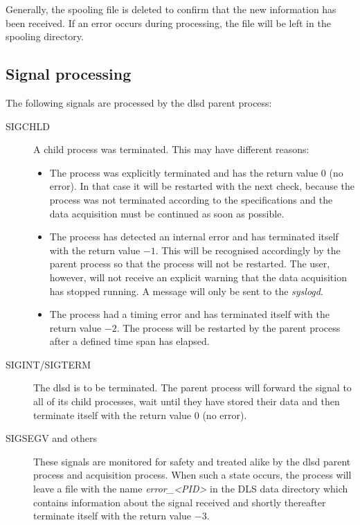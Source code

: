 \documentclass[a4paper,12pt,BCOR6mm,bibtotoc,idxtotoc]{scrbook}
\begin{document}
Generally, the spooling file is deleted to confirm that the new information has been received. If an error occurs during processing, the file will be left in the spooling directory.


\subsection{Signal processing} \label{sec:dlsd_mother_signals} 

The following signals are processed by the dlsd parent process:

\begin{description} 
\item[SIGCHLD] A child process was terminated. This may have different reasons: \begin{itemize} 
\item The process was explicitly terminated and has the return value 0 (no error). In that case it will be restarted with the next check, because the process was not terminated according to the specifications and the data acquisition must be continued as soon as possible. 
\item The process has detected an internal error and has terminated itself with the return value $-1$. This will be recognised accordingly by the parent process so that the process will not be restarted. The user, however, will not receive an explicit warning that the data acquisition has stopped running. A message will only be sent to the \textit{syslogd}. 
\item The process had a timing error and has terminated itself with the return  value $-2$. The process will be restarted by the parent process after a defined time span has elapsed. \end{itemize} 
\item[SIGINT/SIGTERM] The dlsd is to be terminated. The parent process will forward the signal to all of its child processes, wait until they have stored their data and then terminate itself with the return value 0 (no error). 
\item[SIGSEGV and others] These signals are monitored for safety and treated alike by the dlsd parent process and acquisition process. When such a state occurs, the process will leave a file with the name \textit{error\_\textless PID\textgreater} in the DLS data directory which contains information about the signal received and shortly thereafter terminate itself with the return value $-3$. \end{description}
\end{document}

